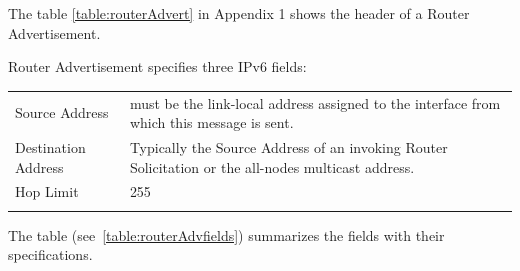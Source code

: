 \documentclass[12pt]{article}
\begin{document}
The table \ref{table:routerAdvert} in Appendix 1 shows the header of a Router Advertisement.

Router Advertisement specifies three IPv6 fields:

\begin{tabular}{L{4.0cm}L{11.5cm}}
\hdashline
 Source Address&must be the link-local address assigned to the interface from which this message is sent.\\
 \hdashline
 Destination Address&Typically the Source Address of an invoking Router Solicitation or the all-nodes multicast address.\\
 \hdashline
 Hop Limit&255\\
 \hdashline
\end{tabular}

\vspace{15pt}
The table (see~\ref{table:routerAdvfields}) summarizes the fields with their specifications.
\end{document}
